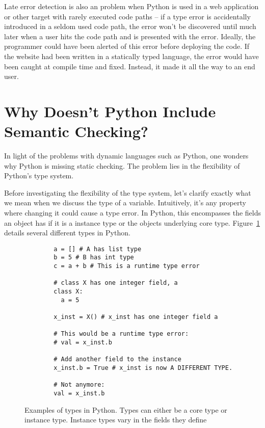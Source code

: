 \documentclass{article}[12pt]
\begin{document}
Late error detection is also an problem when Python is used in a web application or other target with rarely executed
code paths -- if a type error is accidentally introduced in a seldom used code path, the error won't be discovered until
much later when a user hits the code path and is presented with the error. Ideally, the programmer could have been
alerted of this error before deploying the code. If the website had been written in a statically typed language, the
error would have been caught at compile time and fixed. Instead, it made it all the way to an end user.

\section{Why Doesn't Python Include Semantic Checking?}
In light of the problems with dynamic languages such as Python, one wonders why Python is missing
static checking. The problem lies in the flexibility of Python's type system. 

Before investigating the flexibility of the type system, let's clarify exactly what we mean when we
discuss the type of a variable. Intuitively, it's any property where changing it could cause a type
error. In Python, this encompasses the fields an object has if it is a instance type or the objects
underlying core type. Figure~\ref{fig:pythontypes} details several different types in Python.

\begin{figure}
    \begin{verbatim}
        a = [] # A has list type
        b = 5 # B has int type
        c = a + b # This is a runtime type error

        # class X has one integer field, a
        class X:
          a = 5

        x_inst = X() # x_inst has one integer field a

        # This would be a runtime type error:
        # val = x_inst.b
        
        # Add another field to the instance
        x_inst.b = True # x_inst is now A DIFFERENT TYPE. 
        
        # Not anymore:
        val = x_inst.b
    \end{verbatim}
    \caption{Examples of types in Python. Types can either be a core type or instance type. Instance
    types vary in the fields they define}
    \label{fig:pythontypes}
\end{figure}
\end{document}
